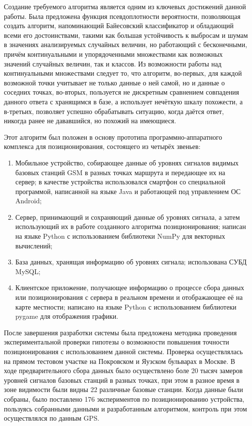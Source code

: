 Создание требуемого алгоритма является одним из ключевых достижений данной работы. Была предложена функция псевдоплотности вероятности, позволяющая создать алгоритм, напоминающий Байесовский классификатор и обладающий всеми его достоинствами, такими как большая устойчивость к выбросам и шумам в значениях анализируемых случайных величин, но работающий с бесконечными, причём континуальными и упорядоченными множествами как возможных значений случайных величин, так и классов. Из возможности работы над континуальными множествами следует то, что алгоритм, во-первых, для каждой возможной точки учитывает не только данные о ней самой, но и данные о соседних точках, во-вторых, пользуется не дискретным сравнением совпадения данного ответа с хранящимся в базе, а использует нечёткую шкалу похожести, а в-третьих, позволяет успешно обрабатывать ситуацию, когда даётся ответ, никогда ранее не дававшийся, но похожий на имеющиеся.

Этот алгоритм был положен в основу прототипа программно-аппаратного комплекса для позиционирования, состоящего из четырёх звеньев:

\begin{enumerate}
	\item
		Мобильное устройство, собирающее данные об уровнях сигналов видимых базовых станций GSM в разных точках маршрута и передающее их на сервер; в качестве устройства использовался смартфон со специальной программой, написанной на языке Java и работающей под управлением ОС Android;
	\item
		Сервер, принимающий и сохраняющий данные об уровнях сигнала, а затем использующий их в работе созданного алгоритма позиционирования; написан на языке Python с использованием библиотеки NumPy для векторных вычислений;
	\item
		База данных, хранящая информацию об уровнях сигнала; использована СУБД MySQL;
	\item
		Клиентское приложение, получающее информацию о процессе сбора данных или позиционирования с сервера в реальном времени и отображающее её на карте местности; написано на языке Python с использованием библиотеки pygame для отображения графики.
\end{enumerate}

После завершения разработки системы была предложена методика проведения экспериментальной проверки гипотезы о возможности повышения точности позиционирования с использованием данной системы. Проверка осуществлялась на прямом тестовом участке на Покровском и Яузском бульварах в Москве. В ходе предварительного сбора данных было осуществлено боле 20 тысяч замеров уровней сигналов базовых станций в разных точках, при этом в разное время в зоне видимости были видны 22 различные базовые станции. Когда данные были собраны, было поставлено 176 экспериментов по позиционированию устройства, пользуясь собранными данными и разработанным алгоритмом, контроль при этом осуществлялся по данным GPS.


